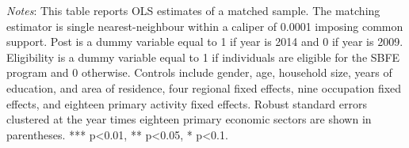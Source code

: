 \begin{landscape}
\begin{table}[H]
\begin{adjustbox}{width=\linewidth}
\begin{threeparttable}
\begin{tablenotes}
				\item \textit{Notes}: This table reports OLS estimates of a matched sample. The matching estimator is single nearest-neighbour within a caliper of 0.0001 imposing common support. Post is a dummy variable equal to 1 if year is 2014 and 0 if year is 2009. Eligibility is a dummy variable equal to 1 if individuals are eligible for the SBFE program and 0 otherwise. Controls include gender, age, household size, years of education, and area of residence, four regional fixed effects, nine occupation fixed effects, and eighteen primary activity fixed effects. Robust standard errors clustered at the year times eighteen primary economic sectors are shown in parentheses. *** p<0.01, ** p<0.05, * p<0.1.
			\end{tablenotes}
		\end{threeparttable}
	\end{adjustbox}
\end{table}

\newpage 


\end{landscape}
